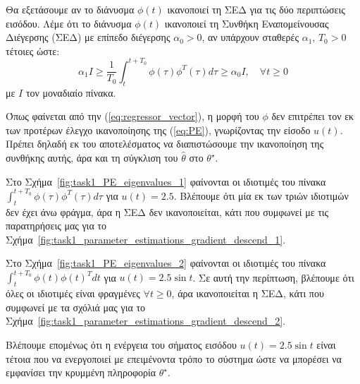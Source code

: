 \documentclass[a4paper,12pt]{article}
\begin{document}
Θα εξετάσουμε αν το διάνυσμα $\phi(t)$ ικανοποιεί τη ΣΕΔ για τις δύο περιπτώσεις εισόδου. Λέμε ότι το διάνυσμα 
$\phi(t)$ ικανοποιεί τη Συνθήκη Εναπομείνουσας Διέγερσης (ΣΕΔ) με επίπεδο διέγερσης $\alpha_0 > 0$, αν
υπάρχουν σταθερές $\alpha_1, \, T_0 > 0$ τέτοιες ώστε:
\begin{equation}
    \alpha_1 I \ge \frac{1}{T_0} \int_{t}^{t+T_0} \phi(\tau) \phi^T(\tau) d\tau \ge \alpha_0 I, 
    \quad \forall t \ge 0
    \label{eq:PE}
\end{equation}
με $I$ τον μοναδιαίο πίνακα.

Όπως φαίνεται από την (\ref{eq:regressor_vector}), η μορφή του $\phi$ δεν επιτρέπει τον εκ των προτέρων
έλεγχο ικανοποίησης της (\ref{eq:PE}), γνωρίζοντας την είσοδο $u(t)$. Πρέπει δηλαδή εκ του αποτελέσματος να 
διαπιστώσουμε την ικανοποίηση της συνθήκης αυτής, άρα και τη σύγκλιση του $\hat{\theta}$ στο $\theta^{\star}$.

Στο Σχήμα~\ref{fig:task1_PE_eigenvalues_1} φαίνονται οι ιδιοτιμές του πίνακα 
$\int_{t}^{t+T_0} \phi(\tau) \phi^T(\tau) d\tau$ για $u(t) = 2.5$. Βλέπουμε ότι μία εκ των τριών ιδιοτιμών δεν
έχει άνω φράγμα, άρα η ΣΕΔ δεν ικανοποιείται, κάτι που συμφωνεί με τις παρατηρήσεις μας για το 
Σχήμα~\ref{fig:task1_parameter_estimations_gradient_descend_1}.

Στο Σχήμα~\ref{fig:task1_PE_eigenvalues_2} φαίνονται οι ιδιοτιμές του πίνακα 
$\int_{t}^{t+T_0} \phi(t) \phi(t)^T dt$ για $u(t) = 2.5 \sin t$. Σε αυτή την περίπτωση, βλέπουμε ότι όλες οι 
ιδιοτιμές είναι φραγμένες $\forall t \ge 0$, άρα ικανοποιείται η ΣΕΔ, κάτι που συμφωνεί με τα σχόλιά μας 
για το Σχήμα~\ref{fig:task1_parameter_estimations_gradient_descend_2}. 

Βλέπουμε επομένως ότι η ενέργεια του σήματος εισόδου $u(t) = 2.5 \sin t$ είναι τέτοια που να ενεργοποιεί με 
επειμένοντα τρόπο το σύστημα ώστε να μπορέσει να εμφανίσει την κρυμμένη πληροφορία $\theta^{\star}$.
\end{document}

